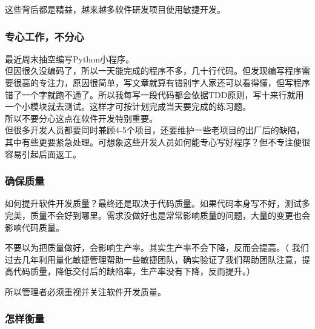 这些背后都是精益，越来越多软件研发项目使用敏捷开发。\\

\hypertarget{ux4e13ux5fc3ux5de5ux4f5cux4e0dux5206ux5fc3}{%
\subsubsection{专心工作，不分心}\label{ux4e13ux5fc3ux5de5ux4f5cux4e0dux5206ux5fc3}}

最近周末抽空编写Python小程序。\\
但因很久没编码了，所以一天能完成的程序不多，几十行代码。但发现编写程序需要很高的专注力，原因很简单，写文章就算有错别字人家还可以看得懂，但写程序错了一个字就跑不通了。所以我每写一段代码都会依据TDD原则，写十来行就用一个小模块就去测试。这样才可按计划完成当天要完成的练习题。\\
所以不要分心这点在软件开发特别重要。\\
但很多开发人员都要同时兼顾4-5个项目，还要维护一些老项目的出厂后的缺陷，其中有些更要紧急处理。可想象这些开发人员如何能专心写好程序？但不专注便很容易引起后面返工。\\

\hypertarget{ux786eux4fddux8d28ux91cf}{%
\subsubsection{确保质量}\label{ux786eux4fddux8d28ux91cf}}

如何提升软件开发质量？最终还是取决于代码质量。如果代码本身写不好，测试多完美，质量不会好到哪里。需求没做好也是常常影响质量的问题，大量的变更也会影响代码质量。

不要以为把质量做好，会影响生产率。其实生产率不会下降，反而会提高。（
我们过去几年利用量化敏捷管理帮助一些敏捷团队，确实验证了我们帮助团队注意，提高代码质量，降低交付后的缺陷率，生产率没有下降，反而提升。）

所以管理者必须重视并关注软件开发质量。

\hypertarget{ux600eux6837ux8861ux91cf}{%
\subsubsection{怎样衡量}\label{ux600eux6837ux8861ux91cf}}


